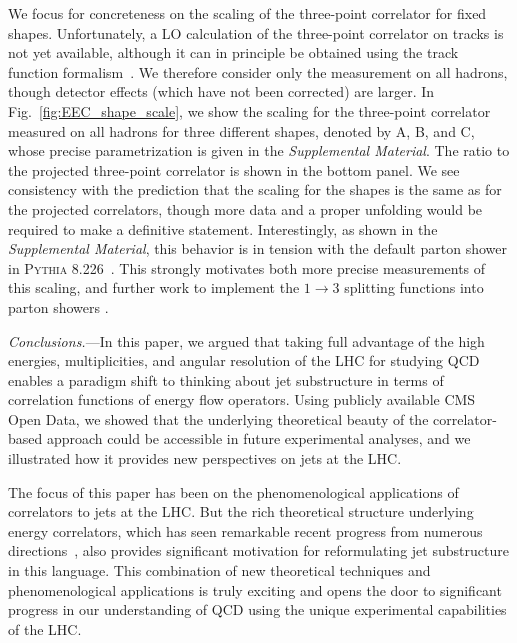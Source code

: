 \documentclass[aps,prl,twocolumn,showpacs,10pt,superscriptaddress,preprintnumbers,nofootinbib,longbibliography]{revtex4-1}
\DeclareRobustCommand{\Fig}[1]{Fig.~\ref{#1}}
\begin{document}
We focus for concreteness on the scaling of the three-point correlator for fixed shapes. Unfortunately, a LO calculation of the three-point correlator on tracks is not yet available, although it can in principle be obtained using the track function formalism~\cite{Chang:2013rca,Chang:2013iba,Elder:2017bkd,Elder:2018mcr,Li:2021zcf}. We therefore consider only the measurement on all hadrons, though detector effects (which have not been corrected) are larger.
%
In  \Fig{fig:EEC_shape_scale},  we show the scaling for the three-point correlator measured on all hadrons for three different shapes, denoted by A, B, and C, whose precise parametrization is given in the \emph{Supplemental Material}. The ratio to the projected three-point correlator is shown in the bottom panel. We see consistency with the prediction that the scaling for the shapes is the same as for the projected correlators, though more data and a proper unfolding would be required to make a definitive statement.
%
Interestingly, as shown in the \emph{Supplemental Material}, this behavior is in tension with the default parton shower in \textsc{Pythia 8.226}~\cite{Sjostrand:2014zea}.
%
This strongly motivates both more precise measurements of this scaling, and further work to implement the $1\to 3$ splitting functions into parton showers \cite{Li:2016yez,Hoche:2017iem,Gellersen:2021eci}.





\emph{Conclusions.}---In this paper, we argued that taking full advantage of the high energies, multiplicities, and angular resolution of the LHC for studying QCD enables a paradigm shift to thinking about jet substructure in terms of correlation functions of energy flow operators.
%
Using publicly available CMS Open Data, we showed that the underlying theoretical beauty of the correlator-based approach could be accessible in future experimental analyses, and we illustrated how it provides new perspectives on jets at the LHC. 


The focus of this paper has been on the phenomenological applications of correlators to jets at the LHC.
%
But the rich theoretical structure underlying energy correlators, which has seen remarkable recent progress from numerous directions~\cite{Dixon:2018qgp,Dixon:2019uzg,Chen:2019bpb,Luo:2019nig,Gao:2020vyx,Chicherin:2020azt,Chen:2021gdk,Henn:2019gkr,Kologlu:2019bco,Kologlu:2019mfz,1822249,Korchemsky:2021okt,Korchemsky:2021htm,Chicherin:2020azt,Ebert:2020sfi}, also provides significant motivation for reformulating jet substructure in this language.
%
This combination of new theoretical techniques and phenomenological applications is truly exciting and opens the door to significant progress in our understanding of QCD using the unique experimental capabilities of the LHC.
\end{document}
